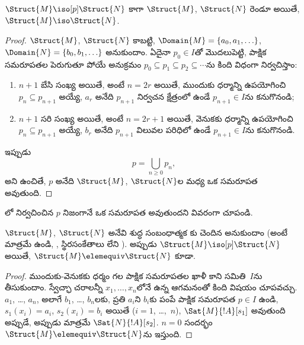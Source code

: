 \documentclass[../../../include/open-logic-section]{subfiles}
\begin{document}
\begin{thm}
  $\Struct{M} \iso[p] \Struct{N}$ కాగా $\Struct{M}$, $\Struct{N}$
  రెండూ  అయితే,
  $\Struct{M} \iso \Struct{N}$.
\end{thm}

\begin{proof}
  $\Struct{M}$, $\Struct{N}$  కాబట్టి,
  $\Domain{M}=\{a_0,a_1,\ldots\}$, $\Domain{N}=\{b_0,b_1,\ldots\}$
  అనుకుందాం. ఏదైనా $p_0 \in I$తో మొదలుపెట్టి, పాక్షిక సమరూపతల
  పెరుగుతూ పోయే అనుక్రమం $p_0 \subseteq p_1 \subseteq p_2 \subseteq
  \cdots$ను కింది విధంగా నిర్వచిస్తాం:
  \begin{enumerate}
  \item $n+1$ బేసి సంఖ్య అయితే, అంటే $n=2r$ అయితే, ముందుకు ధర్మాన్ని
    ఉపయోగించి $p_n \subseteq p_{n+1}$ అయ్యే, $a_r$ అనేది
    $p_{n+1}$ నిర్వచన క్షేత్రంలో ఉండే $p_{n+1}\in I$ను కనుగొనండి;
  \item $n+1$ సరి సంఖ్య అయితే, అంటే $n=2r+1$ అయితే, వెనుకకు ధర్మాన్ని
    ఉపయోగించి $p_n \subseteq p_{n+1}$ అయ్యే, $b_r$ అనేది
    $p_{n+1}$ విలువల పరిధిలో ఉండే $p_{n+1}\in I$ను కనుగొనండి.
  \end{enumerate}
ఇప్పుడు
\[
p=\bigcup_{n\ge 0}p_n,
\]
అని ఉంచితే, $p$ అనేది $\Struct{M}$, $\Struct{N}$ల మధ్య ఒక
సమరూపత అవుతుంది.
\end{proof}

\begin{prob}
  లో నిర్వచించిన $p$ నిజంగానే ఒక
  సమరూపత అవుతుందని వివరంగా చూపండి.
\end{prob}

\begin{thm}
  $\Struct{M}$, $\Struct{N}$ అనేవి శుద్ధ సంబంధాత్మక
  కు చెందిన 
  అనుకుందాం (అంటే  మాత్రమే ఉండి,
  , స్థిరసంకేతాలు లేని
  ). అప్పుడు $\Struct{M} \iso[p] \Struct{N}$
  అయితే, $\Struct{M} \elemequiv \Struct{N}$ కూడా.
\end{thm}

\begin{proof}
  ముందుకు-వెనుకకు ధర్మం గల పాక్షిక సమరూపతల ఖాళీ కాని సమితి~$I$ను తీసుకుందాం.
  స్వేచ్ఛా చరాలన్నీ $x_1,\dots,x_n$లోనే ఉన్న 
  ఆగమనంతో కింది విషయం చూపవచ్చు. $a_1$, \dots, $a_n$, అలాగే
  $b_1$, \dots, $b_n$లకు, ప్రతి $a_i$ని $b_i$కు పంపే పాక్షిక సమరూపత
  $p\in I$ ఉండి, $s_1(x_i)=a_i$, $s_2(x_i)=b_i$ అయితే
  ($i=1$, \dots,~$n$), $\Sat{M}{!A}[s_1]$
  అవుతుంది అప్పుడే, అప్పుడు మాత్రమే $\Sat{N}{!A}[s_2]$. $n=0$ సందర్భం
  $\Struct{M} \elemequiv \Struct{N}$ను ఇస్తుంది.
\end{proof}
\end{document}
